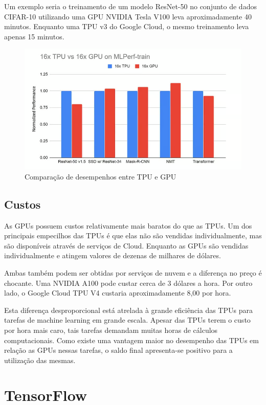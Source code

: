 \documentclass{report}
\begin{document}
Um exemplo seria o treinamento de um modelo ResNet-50 no conjunto de dados CIFAR-10 utilizando uma GPU NVIDIA Tesla V100 leva aproximadamente 40 minutos. Enquanto uma TPU v3 do Google Cloud, o mesmo treinamento leva apenas 15 minutos.

\begin{figure}[h]
	\includegraphics[scale=0.7]{Desempenho}
	\centering
	\caption{Comparação de desempenhos entre TPU e GPU}
\end{figure}


\section{Custos}

As GPUs possuem custos relativamente mais baratos do que as TPUs. Um dos principais empecilhos das TPUs é que elas não são vendidas individualmente, mas são disponíveis através de serviços de Cloud. Enquanto as GPUs são vendidas individualmente e atingem valores de dezenas de milhares de dólares.

Ambas também podem ser obtidas por serviços de nuvem e a diferença no preço é chocante. Uma NVIDIA A100 pode custar cerca de 3 dólares a hora. Por outro lado, o Google Cloud TPU V4 custaria aproximadamente 8,00 por hora.

Esta diferença desproporcional está atrelada à grande eficiência das TPUs para tarefas de machine learning em grande escala. Apesar das TPUs terem o custo por hora mais caro, tais tarefas demandam muitas horas de cálculos computacionais. Como existe uma vantagem maior no desempenho das TPUs em relação as GPUs nessas tarefas, o saldo final apresenta-se positivo para a utilização das mesmas.

\chapter{TensorFlow}
\end{document}
